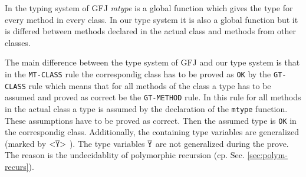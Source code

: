 

\medskip
In the typing system of GFJ \textit{mtype} is a global function which gives the type for every method in every class.
In our type system it is also a global function but it is differed between
methods declared in the actual class and methods from other classes.

The main difference between the type system of GFJ and our type system is that
in the \texttt{MT-CLASS} rule the correspondig class has to be proved as \texttt{OK}
by the \texttt{GT-CLASS} rule which means that for all methods of the class a type has to
be assumed and proved as correct be the \texttt{GT-METHOD} rule.
In this rule
for all methods in the actual class a type is assumed by the
declaration of the \texttt{mtype} function.
These assumptions have to be proved as correct. Then the assumed type is
\texttt{OK} in the correspondig class. Additionally, the containing type
variables are generalized (marked by $\mathtt{ {\tt <} \overline{Y} {\tt >} \ }$). The type variables
$\overline{\mathtt{Y}}$ are not generalized during the prove. The reason is the
undecidablity of polymorphic recursion (cp. Sec. \ref{sec:polym-recurs}).





